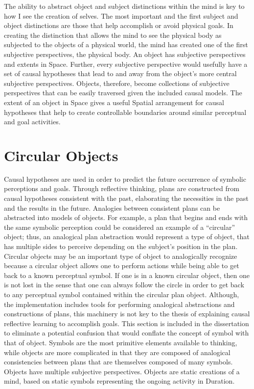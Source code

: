 The ability to abstract object and subject distinctions within the
mind is key to how I see the creation of selves.  The most important
and the first subject and object distinctions are those that help
accomplish or avoid physical goals.  In creating the distinction that
allows the mind to see the physical body as subjected to the objects
of a physical world, the mind has created one of the first subjective
perspectives, the physical body.  An object has subjective
perspectives and extents in Space.  Further, every subjective
perspective would usefully have a set of causal hypotheses that lead
to and away from the object's more central subjective perspectives.
Objects, therefore, become collections of subjective perspectives that
can be easily traversed given the included causal models.  The extent
of an object in Space gives a useful Spatial arrangement for causal
hypotheses that help to create controllable boundaries around similar
perceptual and goal activities.

\section{Circular Objects}

Causal hypotheses are used in order to predict the future occurrence
of symbolic perceptions and goals.  Through reflective thinking, plans
are constructed from causal hypotheses consistent with the past,
elaborating the necessities in the past and the results in the future.
Analogies between consistent plans can be abstracted into models of
objects.  For example, a plan that begins and ends with the same
symbolic perception could be considered an example of a ``circular''
object; thus, an analogical plan abstraction would represent a type of
object, that has multiple sides to perceive depending on the subject's
position in the plan.  Circular objects may be an important type of
object to analogically recognize because a circular object allows one
to perform actions while being able to get back to a known perceptual
symbol.  If one is in a known circular object, then one is not lost in
the sense that one can always follow the circle in order to get back
to any perceptual symbol contained within the circular plan object.
Although, the implementation includes tools for performing analogical
abstractions and constructions of plans, this machinery is not key to
the thesis of explaining causal reflective learning to accomplish
goals.  This section is included in the dissertation to eliminate a
potential confusion that would conflate the concept of symbol with
that of object.  Symbols are the most primitive elements available to
thinking, while objects are more complicated in that they are composed
of analogical consistencies between plans that are themselves composed
of many symbols.  Objects have multiple subjective perspectives.
Objects are static creations of a mind, based on static symbols
representing the ongoing activity in Duration.

